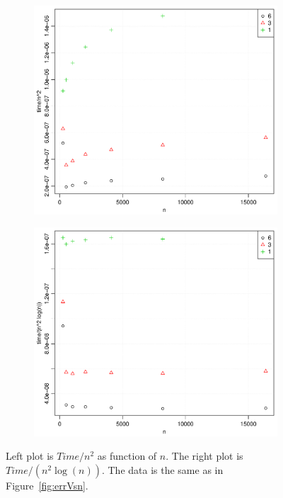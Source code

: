 \begin{figure}[h!]
  \centering
  \begin{subfigure}[b]{0.48\textwidth}
    \includegraphics[width=\textwidth]{./Figures/timeOverN2Vsn.pdf}
  \end{subfigure}%
  \quad
  \begin{subfigure}[b]{0.48\textwidth}
    \includegraphics[width=\textwidth]{./Figures/timeOverN2LogNVsn.pdf}
  \end{subfigure}
  \vspace{-0.1\baselineskip}
  \caption{Left plot is $Time/n^2$ as function of $n$. The right plot is $Time/(n^2 \log (n))$. The data is the same as in Figure~\ref{fig:errVsn}.}
  \label{fig:timeVsn}
\end{figure}
\\
